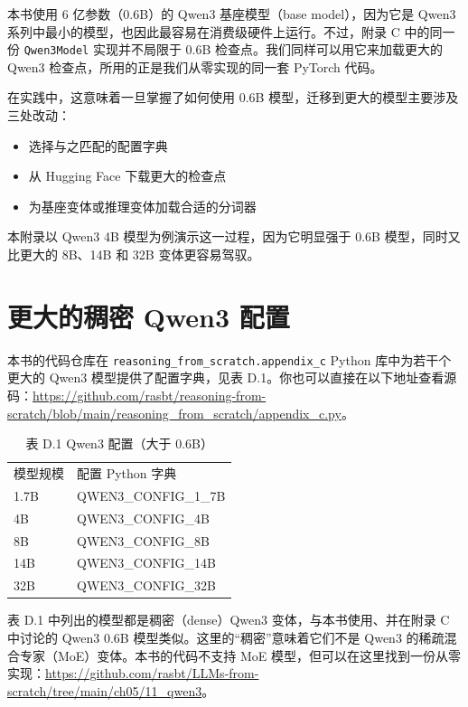本书使用 6 亿参数（0.6B）的 Qwen3 基座模型（base model），因为它是 Qwen3 系列中最小的模型，也因此最容易在消费级硬件上运行。不过，附录 C 中的同一份 \texttt{Qwen3Model} 实现并不局限于 0.6B 检查点。我们同样可以用它来加载更大的 Qwen3 检查点，所用的正是我们从零实现的同一套 PyTorch 代码。

在实践中，这意味着一旦掌握了如何使用 0.6B 模型，迁移到更大的模型主要涉及三处改动：

\begin{itemize}
\item 选择与之匹配的配置字典
\item 从 Hugging Face 下载更大的检查点
\item 为基座变体或推理变体加载合适的分词器
\end{itemize}

本附录以 Qwen3 4B 模型为例演示这一过程，因为它明显强于 0.6B 模型，同时又比更大的 8B、14B 和 32B 变体更容易驾驭。

\section{更大的稠密 Qwen3 配置}

本书的代码仓库在 \texttt{reasoning\_from\_scratch.appendix\_c} Python 库中为若干个更大的 Qwen3 模型提供了配置字典，见表 D.1。你也可以直接在以下地址查看源码：\href{https://github.com/rasbt/reasoning-from-scratch/blob/main/reasoning\_from\_scratch/appendix\_c.py}{https://github.com/rasbt/reasoning-from-scratch/blob/main/reasoning\_from\_scratch/appendix\_c.py}。

\begin{table}[htbp]
\centering\small
\centering
\caption{表 D.1 Qwen3 配置（大于 0.6B）}
\begin{tabularx}{\linewidth}{XX}
\toprule
模型规模 & 配置 Python 字典 \\
1.7B & QWEN3\_\allowbreak{}CONFIG\_\allowbreak{}1\_\allowbreak{}7B \\
4B & QWEN3\_\allowbreak{}CONFIG\_\allowbreak{}4B \\
8B & QWEN3\_\allowbreak{}CONFIG\_\allowbreak{}8B \\
14B & QWEN3\_\allowbreak{}CONFIG\_\allowbreak{}14B \\
32B & QWEN3\_\allowbreak{}CONFIG\_\allowbreak{}32B \\ \bottomrule
\end{tabularx}
\end{table}

表 D.1 中列出的模型都是稠密（dense）Qwen3 变体，与本书使用、并在附录 C 中讨论的 Qwen3 0.6B 模型类似。这里的“稠密”意味着它们不是 Qwen3 的稀疏混合专家（MoE）变体。本书的代码不支持 MoE 模型，但可以在这里找到一份从零实现：\href{https://github.com/rasbt/LLMs-from-scratch/tree/main/ch05/11\_qwen3}{https://github.com/rasbt/LLMs-from-scratch/tree/main/ch05/11\_qwen3}。


